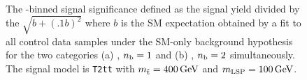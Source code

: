 \begin{figure}[h!]
  \begin{center}
     \\
    \caption{\label{fig:t2tt-sig-400_100} The \scalht-binned 
      signal significance defined as the signal yield 
      divided by the $\sqrt{b+(.1b)^2}$ where $b$ is the
      SM expectation obtained by a fit to all 
      control data samples under the SM-only background 
      hypothesis for the two categories (a) \njethigh, $n_{\text{b}} = 1$ and (b) 
      \njethigh, $n_{\text{b}} = 2$ simultaneously. 
      The signal model is \texttt{T2tt} with 
      $m_{\tilde{\rm t}} = 400\,\text{Ge\hspace{-.08em}V}$ and $m_{\text{LSP}} = 100\,\text{Ge\hspace{-.08em}V}$.} 
  \end{center}
\end{figure}


